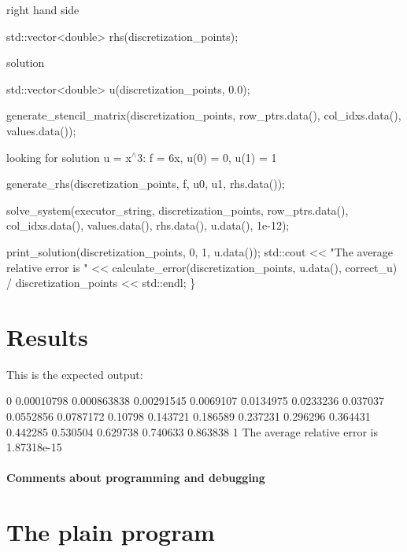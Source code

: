 right hand side


\begin{DoxyCode}
std::vector<double> rhs(discretization\_points);
\end{DoxyCode}


solution


\begin{DoxyCode}
std::vector<double> u(discretization\_points, 0.0);

generate\_stencil\_matrix(discretization\_points, row\_ptrs.data(),
                        col\_idxs.data(), values.data());
\end{DoxyCode}


looking for solution u = x$^\wedge$3\+: f = 6x, u(0) = 0, u(1) = 1


\begin{DoxyCode}
    generate\_rhs(discretization\_points, f, u0, u1, rhs.data());

    solve\_system(executor\_string, discretization\_points, row\_ptrs.data(),
                 col\_idxs.data(), values.data(), rhs.data(), u.data(), 1e-12);

    print\_solution(discretization\_points, 0, 1, u.data());
    std::cout << \textcolor{stringliteral}{"The average relative error is "}
              << calculate\_error(discretization\_points, u.data(), correct\_u) /
                     discretization\_points
              << std::endl;
\}
\end{DoxyCode}
 \label{_Results}%
\section*{Results}

This is the expected output\+:


\begin{DoxyCode}
0
0.00010798
0.000863838
0.00291545
0.0069107
0.0134975
0.0233236
0.037037
0.0552856
0.0787172
0.10798
0.143721
0.186589
0.237231
0.296296
0.364431
0.442285
0.530504
0.629738
0.740633
0.863838
1
The average relative error is 1.87318e-15
\end{DoxyCode}


\label{_Commentsaboutprogramminganddebugging}%
\paragraph*{Comments about programming and debugging }

\label{_PlainProg}%
 \section*{The plain program}


